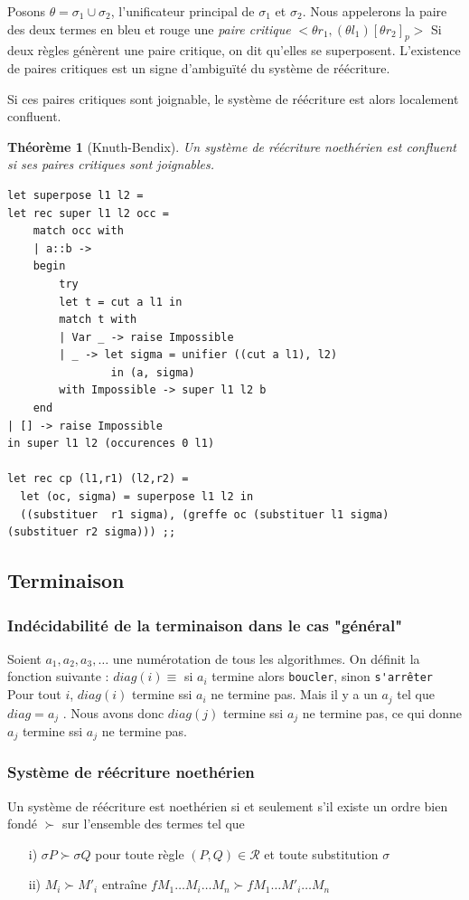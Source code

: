 \documentclass[11pt]{book}
\newtheorem{theoreme}{Théorème}
\begin{document}
	Posons $\theta =  \sigma_1 \cup \sigma_2$, l'unificateur principal de $\sigma_1$ et $\sigma_2$.
	Nous appelerons la paire des deux termes en bleu et rouge
	 une \textit{paire critique} $<\theta r_1, (\theta l_1)[\theta r_2]_p > $
	 Si deux règles génèrent une paire critique, on dit qu'elles se superposent.
     L'existence de paires critiques est un signe d'ambiguïté du système de réécriture.

	 Si ces paires critiques sont joignable, le système de réécriture est alors localement confluent.
	 \begin{theoreme}[Knuth-Bendix]
		  Un système de réécriture noethérien est confluent si ses paires critiques sont joignables.
	\end{theoreme}
\begin{Verbatim}
let superpose l1 l2 =
let rec super l1 l2 occ =
	match occ with
	| a::b -> 
	begin
		try 
		let t = cut a l1 in
		match t with 
		| Var _ -> raise Impossible
		| _ -> let sigma = unifier ((cut a l1), l2)
				in (a, sigma)
		with Impossible -> super l1 l2 b 
	end
| [] -> raise Impossible
in super l1 l2 (occurences 0 l1)

let rec cp (l1,r1) (l2,r2) =
  let (oc, sigma) = superpose l1 l2 in
  ((substituer  r1 sigma), (greffe oc (substituer l1 sigma) (substituer r2 sigma))) ;;  
\end{Verbatim}

\subsection{Terminaison}
\subsubsection{Indécidabilité de la terminaison dans le cas "général"}
Soient $a_1,a_2 ,a_3 , \dots$ une numérotation de tous les algorithmes.
On définit la fonction suivante : $diag(i) ≡$ si $a_i$ termine alors \verb+boucler+, sinon \verb+s'arrêter+ \\

Pour tout $i$, $diag(i)$ termine ssi $a_i$ ne termine pas.
Mais il y a un $a_j$ tel que $diag = a_j$ . Nous avons donc
$diag(j)$ termine ssi $a_j$ ne termine pas, ce qui donne
$a_j$ termine ssi $a_j$ ne termine pas.

\subsubsection{Système de réécriture noethérien}
Un système de réécriture est noethérien si et seulement s'il existe un ordre bien fondé
$\succ$ sur l'ensemble des termes tel que
\begin{itemize}
	\item[i)] $\sigma P \succ \sigma Q$ pour toute règle $(P,Q) \in \mathcal{R}$ et toute substitution $\sigma$
	\item[ii)] $M_i \succ M'_i$ entraîne $ fM_1\dots M_i \dots M_n \succ fM_1\dots M'_i \dots M_n $
\end{itemize}
\end{document}
